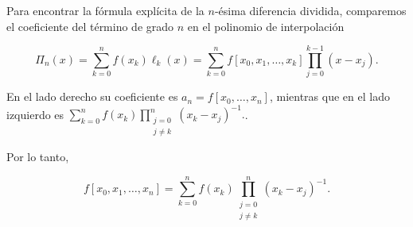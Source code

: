 \begin{frame}
	\begin{solution}
		Para encontrar la fórmula explícita de la
		\alert{$n$-ésima diferencia dividida}, comparemos el coeficiente
		del término de grado $n$ en el polinomio de interpolación

		\begin{equation*}
			\Pi_{n}\left(x\right)=
			\sum\limits_{k=0}^{n}
			f\left(x_{k}\right)
			\ell_{k}\left(x\right)=
			\sum\limits_{k=0}^{n}
			f\left[x_{0},x_{1},\ldots,x_{k}\right]
			\prod\limits_{j=0}^{k-1}
			\left(x-x_{j}\right).
		\end{equation*}

		En el lado derecho su coeficiente es
		$a_{n}=f\left[x_{0},\ldots,x_{n}\right]$, mientras que en el lado
		izquierdo es
		\begin{math}
			\sum\limits_{k=0}^{n}
			f\left(x_{k}\right)
			\prod\limits_{\substack{j=0\\j\neq k}}^{n}
			{\left(x_{k}-x_{j}\right)}^{-1}.
		\end{math}.

		Por lo tanto,

		\begin{equation*}
			f\left[x_{0},x_{1},\ldots,x_{n}\right]=
			\sum\limits_{k=0}^{n}
			f\left(x_{k}\right)
			\prod\limits_{\substack{j=0\\j\neq k}}^{n}
			{\left(x_{k}-x_{j}\right)}^{-1}.
		\end{equation*}



	\end{solution}
\end{frame}

